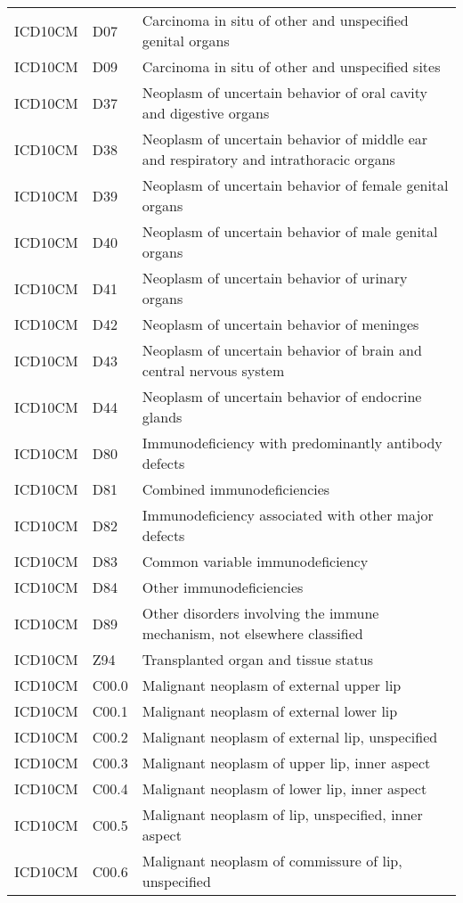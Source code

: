 \begin{longtable}{p{}p{}p{}}
  ICD10CM & D07 & Carcinoma in situ of other and unspecified genital organs \\ 
  ICD10CM & D09 & Carcinoma in situ of other and unspecified sites \\ 
  ICD10CM & D37 & Neoplasm of uncertain behavior of oral cavity and digestive organs \\ 
  ICD10CM & D38 & Neoplasm of uncertain behavior of middle ear and respiratory and intrathoracic organs \\ 
  ICD10CM & D39 & Neoplasm of uncertain behavior of female genital organs \\ 
  ICD10CM & D40 & Neoplasm of uncertain behavior of male genital organs \\ 
  ICD10CM & D41 & Neoplasm of uncertain behavior of urinary organs \\ 
  ICD10CM & D42 & Neoplasm of uncertain behavior of meninges \\ 
  ICD10CM & D43 & Neoplasm of uncertain behavior of brain and central nervous system \\ 
  ICD10CM & D44 & Neoplasm of uncertain behavior of endocrine glands \\ 
  ICD10CM & D80 & Immunodeficiency with predominantly antibody defects \\ 
  ICD10CM & D81 & Combined immunodeficiencies \\ 
  ICD10CM & D82 & Immunodeficiency associated with other major defects \\ 
  ICD10CM & D83 & Common variable immunodeficiency \\ 
  ICD10CM & D84 & Other immunodeficiencies \\ 
  ICD10CM & D89 & Other disorders involving the immune mechanism, not elsewhere classified \\ 
  ICD10CM & Z94 & Transplanted organ and tissue status \\ 
  ICD10CM & C00.0 & Malignant neoplasm of external upper lip \\ 
  ICD10CM & C00.1 & Malignant neoplasm of external lower lip \\ 
  ICD10CM & C00.2 & Malignant neoplasm of external lip, unspecified \\ 
  ICD10CM & C00.3 & Malignant neoplasm of upper lip, inner aspect \\ 
  ICD10CM & C00.4 & Malignant neoplasm of lower lip, inner aspect \\ 
  ICD10CM & C00.5 & Malignant neoplasm of lip, unspecified, inner aspect \\ 
  ICD10CM & C00.6 & Malignant neoplasm of commissure of lip, unspecified \\ 

\end{longtable}
